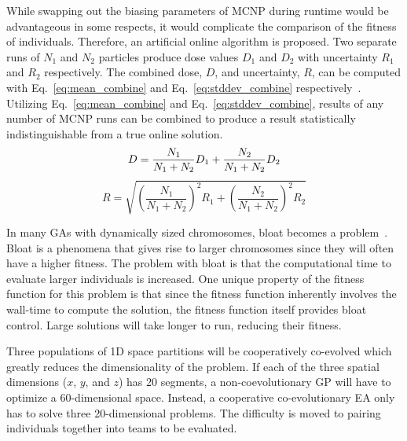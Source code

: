 \documentclass{article}
\begin{document}
While swapping out the biasing parameters of MCNP during runtime would be advantageous in some respects, it would complicate the comparison of the fitness of individuals. Therefore, an artificial online algorithm is proposed. Two separate runs of $N_1$ and $N_2$ particles produce dose values $D_1$ and $D_2$ with uncertainty $R_1$ and $R_2$ respectively. The combined dose, $D$, and uncertainty, $R$, can be computed with Eq.~\ref{eq:mean_combine} and Eq.~\ref{eq:stddev_combine} respectively~\cite{ref:knoll2000}. Utilizing Eq.~\ref{eq:mean_combine} and Eq.~\ref{eq:stddev_combine}, results of any number of MCNP runs can be combined to produce a result statistically indistinguishable from a true online solution.
\begin{equation}\label{eq:mean_combine}
D = \frac{N_1}{N_1 + N_2} D_1 + \frac{N_2}{N_1 + N_2} D_2 \\
\end{equation}
\begin{equation}\label{eq:stddev_combine}
R = \sqrt{\left( \frac{N_1}{N_1 + N_2}\right)^2 R_1 + \left( \frac{N_2}{N_1 + N_2}\right)^2 R_2}
\end{equation}

In many GAs with dynamically sized chromosomes, bloat becomes a problem~\cite{ref:Tanev2012}. Bloat is a phenomena that gives rise to larger chromosomes since they will often have a higher fitness. The problem with bloat is that the computational time to evaluate larger individuals is increased. One unique property of the fitness function for this problem is that since the fitness function inherently involves the wall-time to compute the solution, the fitness function itself provides bloat control. Large solutions will take longer to run, reducing their fitness.

Three populations of 1D space partitions will be cooperatively co-evolved which greatly reduces the dimensionality of the problem. If each of the three spatial dimensions ($x$, $y$, and $z$) has 20 segments, a non-coevolutionary GP will have to optimize a 60-dimensional space. Instead, a cooperative co-evolutionary EA only has to solve three 20-dimensional problems. The difficulty is moved to pairing individuals together into teams to be evaluated.
\end{document}
